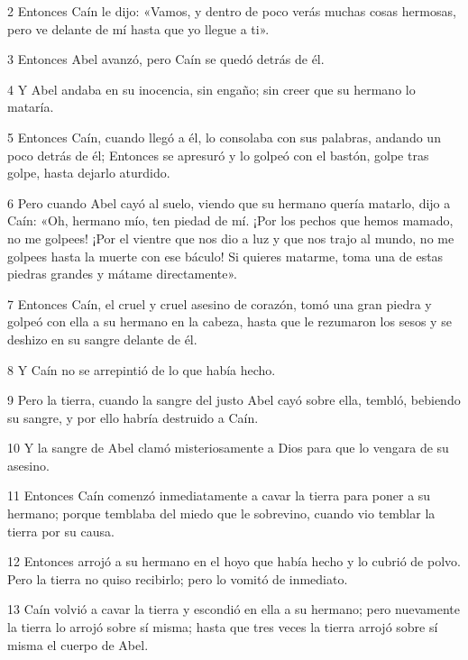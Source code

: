 \par 2 Entonces Caín le dijo: «Vamos, y dentro de poco verás muchas cosas hermosas, pero ve delante de mí hasta que yo llegue a ti».

\par 3 Entonces Abel avanzó, pero Caín se quedó detrás de él.

\par 4 Y Abel andaba en su inocencia, sin engaño; sin creer que su hermano lo mataría.

\par 5 Entonces Caín, cuando llegó a él, lo consolaba con sus palabras, andando un poco detrás de él; Entonces se apresuró y lo golpeó con el bastón, golpe tras golpe, hasta dejarlo aturdido.

\par 6 Pero cuando Abel cayó al suelo, viendo que su hermano quería matarlo, dijo a Caín: «Oh, hermano mío, ten piedad de mí. ¡Por los pechos que hemos mamado, no me golpees! ¡Por el vientre que nos dio a luz y que nos trajo al mundo, no me golpees hasta la muerte con ese báculo! Si quieres matarme, toma una de estas piedras grandes y mátame directamente».

\par 7 Entonces Caín, el cruel y cruel asesino de corazón, tomó una gran piedra y golpeó con ella a su hermano en la cabeza, hasta que le rezumaron los sesos y se deshizo en su sangre delante de él.

\par 8 Y Caín no se arrepintió de lo que había hecho.

\par 9 Pero la tierra, cuando la sangre del justo Abel cayó sobre ella, tembló, bebiendo su sangre, y por ello habría destruido a Caín.

\par 10 Y la sangre de Abel clamó misteriosamente a Dios para que lo vengara de su asesino.

\par 11 Entonces Caín comenzó inmediatamente a cavar la tierra para poner a su hermano; porque temblaba del miedo que le sobrevino, cuando vio temblar la tierra por su causa.

\par 12 Entonces arrojó a su hermano en el hoyo que había hecho y lo cubrió de polvo. Pero la tierra no quiso recibirlo; pero lo vomitó de inmediato.

\par 13 Caín volvió a cavar la tierra y escondió en ella a su hermano; pero nuevamente la tierra lo arrojó sobre sí misma; hasta que tres veces la tierra arrojó sobre sí misma el cuerpo de Abel.

